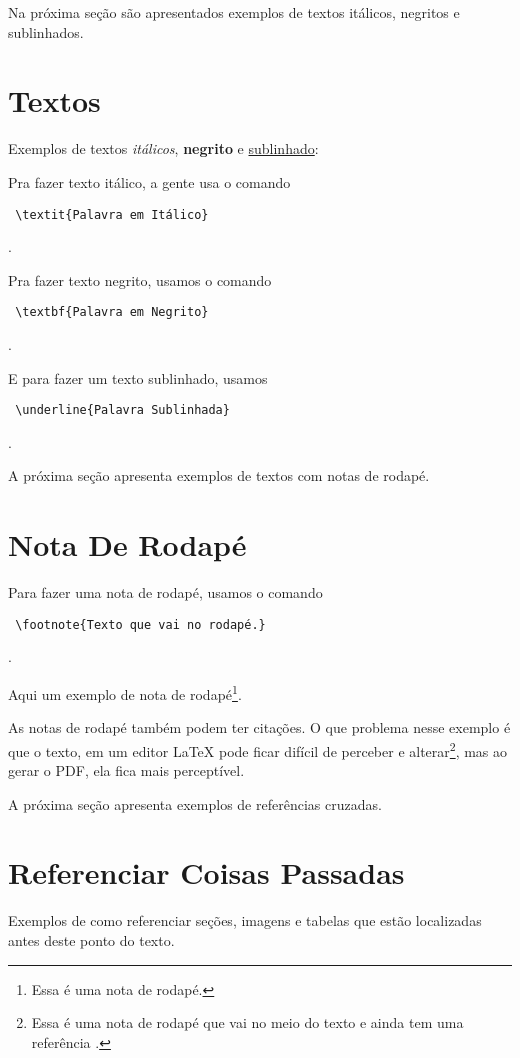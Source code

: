 Na próxima seção são apresentados exemplos de textos itálicos, negritos e sublinhados.


\section{Textos}

Exemplos de textos \textit{itálicos}, \textbf{negrito} e \underline{sublinhado}:

Pra fazer texto itálico, a gente usa o comando \begin{verbatim} \textit{Palavra em Itálico} \end{verbatim}.

Pra fazer texto negrito, usamos o comando \begin{verbatim} \textbf{Palavra em Negrito} \end{verbatim}.

E para fazer um texto sublinhado, usamos \begin{verbatim} \underline{Palavra Sublinhada} \end{verbatim}.

A próxima seção apresenta exemplos de textos com notas de rodapé.

\section{Nota De Rodapé}

Para fazer uma nota de rodapé, usamos o comando \begin{verbatim} \footnote{Texto que vai no rodapé.} \end{verbatim}.

Aqui um exemplo de nota de rodapé\footnote{Essa é uma nota de rodapé.}.

As notas de rodapé também podem ter citações. O que problema nesse exemplo é que o texto, em um editor LaTeX pode ficar difícil de perceber e alterar\footnote{Essa é uma nota de rodapé que vai no meio do texto e ainda tem uma referência \cite{UTFPR2017}.}, mas ao gerar o PDF, ela fica mais perceptível.

A próxima seção apresenta exemplos de referências cruzadas.

\section{Referenciar Coisas Passadas}

Exemplos de como referenciar seções, imagens e tabelas que estão localizadas antes deste ponto do texto.

